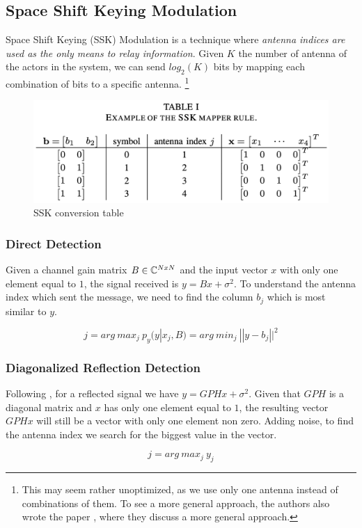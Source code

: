\subsection{Space Shift Keying Modulation}
Space Shift Keying (SSK) Modulation \cite{5165332} is a technique where \textit{antenna indices are used as the only means to relay information}. Given $K$ the number of antenna of the actors in the system, we can send $log_2(K)$ bits by mapping each combination of bits to a specific antenna.
\footnote{This may seem rather unoptimized, as we use only one antenna instead of combinations of them. To see a more general approach, the authors also wrote the paper \cite{4699782}, where they discuss a more general approach.}

\begin{figure}[H]
  \centering
  \includegraphics[width=\linewidth]{imgs/ssk_conversion_table.png}
  \caption{SSK conversion table}
  \label{fig:ssk_conversion_table}
\end{figure}

\subsubsection{Direct Detection}
Given a channel gain matrix $B \in \mathbb{C}^{NxN}$ and the input vector $x$ with only one element equal to $1$, the signal received is $y = Bx + \sigma^2$. To understand the antenna index which sent the message, we need to find the column $b_j$ which is most similar to $y$.

\begin{equation}
  j = arg\ max_j\ p_y (y | x_j, B) = arg\ min_j\ || y - b_j ||^2
\end{equation}

\subsubsection{Diagonalized Reflection Detection}
Following \cite{9328149}, for a reflected signal we have $y = GPHx + \sigma^2$. Given that $GPH$ is a diagonal matrix and $x$ has only one element equal to $1$, the resulting vector $GPHx$ will still be a vector with only one element non zero. Adding noise, to find the antenna index we search for the biggest value in the vector.

\begin{equation}
  j = arg\ max_j\ y_j
\end{equation}